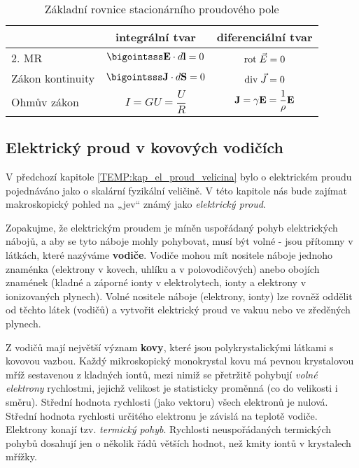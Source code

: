 {    \begin{table}[ht!]
      \setlength\extrarowheight{5pt}
      \centering
      \begin{tabular}{lc|c|}
        \cline{2-3}
        \multicolumn{1}{l|}{} 
          & \textbf{integrální tvar} & \textbf{diferenciální tvar}                    \\[8pt]
        \hline
        \multicolumn{1}{|l|}{2. MR} 
          & \(\bigointsss\vr{E}\cdot d\vr{l} = 0\) & \(\mathrm{rot}\;\vec{E} = 0\)                  \\[8pt] 
        \cline{1-3}
        \hline
        \multicolumn{1}{|l|}{Zákon kontinuity} 
          & \(\bigointsss\vr{J}\cdot d\vr{S}=0\) & \(\mathrm{div}\;\vec{J}=0\)                    \\[8pt]
        \cline{1-3}
        \multicolumn{1}{|l|}{Ohmův zákon}
          & \(I=GU=\dfrac{U}{R}\) & \(\mathbf{J} = \gamma\mathbf{E} = \dfrac{1}{\rho}\mathbf{E}\) \\[8pt]
        \cline{1-3}
      \end{tabular}
      \caption{Základní rovnice stacionárního proudového pole}
    \end{table}
    
    \subsection{Elektrický proud v kovových vodičích}\label{TEMP:kap_elproud_jev}
      V předchozí kapitole \ref{TEMP:kap_el_proud_velicina} bylo o elektrickém proudu pojednáváno
      jako o skalární fyzikální veličině. V této kapitole nás bude zajímat makroskopický pohled na
      „jev“ známý jako \emph{elektrický proud}.
      
      Zopakujme, že elektrickým proudem je míněn uspořádaný pohyb elektrických ná\-bo\-jů, a aby se
      tyto náboje mohly pohybovat, musí být volné - jsou přítomny v látkách, které nazýváme
      \textbf{vodiče}. Vodiče mohou mít nositele náboje jednoho znaménka (elektrony v kovech,
      uhlíku a v polovodičových) anebo obojích znamének (kladné a záporné ionty v elektrolytech,
      ionty a elektrony v ionizovaných plynech). Volné nositele náboje (elektrony, ionty) lze
      rovněž oddělit od těchto látek (vodičů) a vytvořit elektrický proud ve vakuu nebo ve
      zředěných plynech.
      
      Z vodičů mají největší význam \textbf{kovy}, které jsou polykrystalickými látkami s kovovou
      vazbou. Každý mikroskopický monokrystal kovu má pevnou krystalovou mříž sestavenou z kladných
      iontů, mezi nimiž se přetržitě pohybují \emph{volné elektrony} rychlost\-mi, jejichž velikost
      je statisticky proměnná (co do velikosti i směru). Střední hodnota rychlosti (jako vektoru)
      všech elektronů je nulová. Střední hodnota rychlosti určitého elektronu je závislá na teplotě
      vodiče. Elektrony konají tzv. \emph{termický pohyb}. Rychlosti neuspořádaných termických
      pohybů dosahují jen o několik řádů větších hodnot, než kmity iontů v krystalech mřížky.

}
